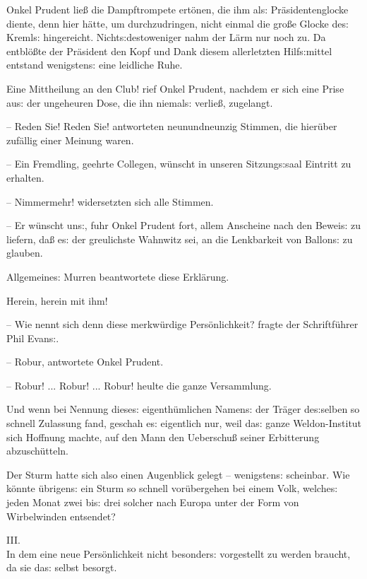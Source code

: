 \documentclass[oneside,12pt]{book}
\newenvironment{antiqua}{\normalfont}{}
\newcommand{\s}{s:}
\begin{document}
Onkel Prudent lie{\ss} die Dampftrompete ert\"onen, die ihm al{\s}
Pr\"asidentenglocke diente, denn hier h\"atte, um durchzudringen,
nicht einmal die gro{\ss}e Glocke de{\s} Kreml{\s} hingereicht.
Nicht{\s}destoweniger nahm der L\"arm nur noch zu. Da
{\glqq}entbl\"o{\ss}te der Pr\"asident den Kopf{\grqq} und Dank
diesem allerletzten Hilf{\s}mittel entstand wenigsten{\s} eine
leidliche Ruhe.

{\glqq}Eine Mittheilung an den Club! rief Onkel Prudent, nachdem er
sich eine Prise au{\s} der ungeheuren Dose, die ihn niemal{\s}
verlie{\ss}, zugelangt.

-- Reden Sie! Reden Sie! antworteten neunundneunzig Stimmen, die
hier\"uber zuf\"allig einer Meinung waren.

-- Ein Fremdling, geehrte Collegen, w\"unscht in unseren
Sitzung{\s}saal Eintritt zu erhalten.

-- Nimmermehr! widersetzten sich alle Stimmen.

-- Er w\"unscht un{\s}, fuhr Onkel Prudent fort, allem Anscheine nach
den Bewei{\s} zu liefern, da{\ss} e{\s} der greulichste Wahnwitz sei,
an die Lenkbarkeit von Ballon{\s} zu glauben.{\grqq}

Allgemeine{\s} Murren beantwortete diese Erkl\"arung.

{\glqq}Herein, herein mit ihm!

-- Wie nennt sich denn diese merkw\"urdige Pers\"onlichkeit? fragte
der Schriftf\"uhrer Phil Evan{\s}.

-- Robur, antwortete Onkel Prudent.

-- Robur! ... Robur! ... Robur!{\grqq} heulte die ganze Versammlung.

Und wenn bei Nennung diese{\s} eigenth\"umlichen Namen{\s} der
Tr\"ager de{\s}selben so schnell Zulassung fand, geschah e{\s}
eigentlich nur, weil da{\s} ganze Weldon-Institut sich Hoffnung
machte, auf den Mann den Ueberschu{\ss} seiner Erbitterung
abzusch\"utteln.

\enlargethispage{\baselineskip}

Der Sturm hatte sich also einen Augenblick gelegt -- wenigsten{\s}
scheinbar. Wie k\"onnte \"ubrigen{\s} ein Sturm so schnell
vor\"ubergehen bei einem Volk, welche{\s} jeden Monat zwei bi{\s}
drei solcher nach Europa unter der Form von Wirbelwinden entsendet?



\newpage\begin{center}\label{kap03}
{\large \begin{antiqua}III.\end{antiqua}\\\medskip
In dem eine neue Pers\"onlichkeit nicht besonder{\s} vorgestellt
zu werden braucht, da sie da{\s} selbst besorgt.\\\bigskip}
\end{center}
\end{document}
